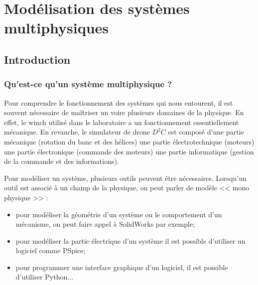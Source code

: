 \setchapterpreamble[u]{\margintoc}
\chapter{Modélisation des systèmes multiphysiques}





\section{Introduction}
\subsection{Qu'est-ce qu'un système multiphysique ?}

Pour comprendre le fonctionnement des systèmes qui nous entourent, il est souvent nécessaire de maîtriser un voire plusieurs domaines de la physique. En effet, le winch utilisé dans le laboratoire a un fonctionnement essentiellement mécanique. En revanche, le simulateur de drone $D^2C$ est composé d'une partie mécanique (rotation du banc et des hélices) une partie électrotechnique (moteurs) une partie électronique (commande des moteurs) une partie informatique (gestion de la commande et des informations). 

Pour modéliser un système, plusieurs outils peuvent être nécessaires. Lorsqu'un outil est associé à un champ de la physique, on peut parler de modèle << mono physique >> :
\begin{itemize}
\item pour modéliser la géométrie d'un système ou le comportement d'un mécanisme, on peut faire appel à SolidWorks par exemple;
\item pour modéliser la partie électrique d'un système il est possible d'utiliser un logiciel comme PSpice;
\item pour programmer une interface graphique d'un logiciel, il est possible d'utiliser Python...
\end{itemize}

